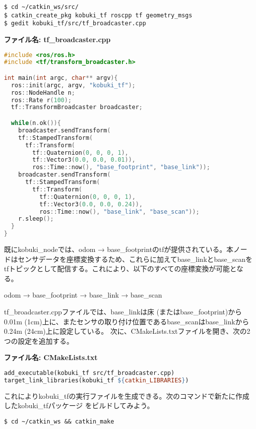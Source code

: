 \begin{lstlisting}[language=ROS]
$ cd ~/catkin_ws/src/
$ catkin_create_pkg kobuki_tf roscpp tf geometry_msgs
$ gedit kobuki_tf/src/tf_broadcaster.cpp
\end{lstlisting}

\textbf{ファイル名: tf\_broadcaster.cpp}

\begin{lstlisting}[language=C++]
#include <ros/ros.h>
#include <tf/transform_broadcaster.h>

int main(int argc, char** argv){
  ros::init(argc, argv, "kobuki_tf");
  ros::NodeHandle n;
  ros::Rate r(100);
  tf::TransformBroadcaster broadcaster;

  while(n.ok()){
    broadcaster.sendTransform(
    tf::StampedTransform(
      tf::Transform(
        tf::Quaternion(0, 0, 0, 1),
        tf::Vector3(0.0, 0.0, 0.01)),
        ros::Time::now(), "base_footprint", "base_link"));
    broadcaster.sendTransform(
      tf::StampedTransform(
        tf::Transform(
          tf::Quaternion(0, 0, 0, 1),
          tf::Vector3(0.0, 0.0, 0.24)),
          ros::Time::now(), "base_link", "base_scan"));
    r.sleep();
  }
}
\end{lstlisting}

既にkobuki\_nodeでは、odom → base\_footprintのtfが提供されている。本ノードはセンサデータを座標変換するため、これらに加えてbase\_linkとbase\_scanをtfトピックとして配信する。これにより、以下のすべての座標変換が可能となる。

\vspace{\baselineskip}
odom → base\_footprint → base\_link → base\_scan
\vspace{\baselineskip}

tf\_broadcaster.cppファイルでは、base\_linkは床 (またはbase\_footprint)から0.01m (1cm)上に、またセンサの取り付け位置であるbase\_scanはbase\_linkから0.24m (24cm)上に設定している。
次に、CMakeLists.txtファイルを開き、次の2つの設定を追加する。

\textbf{ファイル名: CMakeLists.txt}
\begin{lstlisting}[language=make]
add_executable(kobuki_tf src/tf_broadcaster.cpp)
target_link_libraries(kobuki_tf ${catkin_LIBRARIES})
\end{lstlisting}

これによりkobuki\_tfの実行ファイルを生成できる。次のコマンドで新たに作成したkobuki\_tfパッケージ  をビルドしてみよう。

\begin{lstlisting}[language=ROS]
$ cd ~/catkin_ws && catkin_make
\end{lstlisting}

